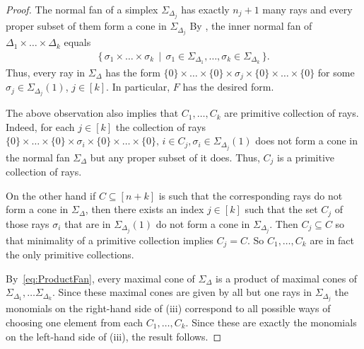 \documentclass[a4paper,11pt]{amsart}
\theoremstyle{definition}
\begin{document}
\begin{proof}
The normal fan of a simplex $\Sigma_{\Delta_j}$ has exactly $n_j + 1$ many rays and every proper subset of them form a cone in $\Sigma_{\Delta_j}$
By \cite[Lemma 7.7]{Ziegler}, the inner normal fan of $\Delta_1 \times \dots \times \Delta_k$  equals
    \begin{align}
    \label{eq:ProductFan}
        \{ \, \sigma_1 \times \dots \times \sigma_k \, \mid \, \sigma_1 \in \Sigma_{\Delta_1}, \dots, \sigma_k \in \Sigma_{\Delta_k} \,  \}.
    \end{align}
Thus, every ray in $\Sigma_\Delta$ has the form $\{0\} \times \dots \times \{0\} \times \sigma_j \times \{0\} \times \dots \times \{0\}$ for some $\sigma_j \in \Sigma_{\Delta_j}(1)$, $j \in [k]$. In particular, $F$ has the desired form.

The above observation also implies that $C_1,\dots,C_k$ are primitive collection of rays. Indeed, for each $j \in [k]$ the collection of rays $\{0\} \times \dots \times \{0\} \times \sigma_i \times \{0\} \times \dots \times \{0\}, \, i \in C_j, \sigma_i \in \Sigma_{\Delta_j}(1)$ does not form a cone in the normal fan $\Sigma_\Delta$ but any proper subset of it does. Thus, $C_j$ is a primitive collection of rays.
  
  On the other hand if $C\subseteq [n+k]$ is such that the corresponding rays do not form a cone in $\Sigma_\Delta$, then there exists an index $j \in [k]$ such that the set $C_j$ of those rays $\sigma_i$ that are in $\Sigma_{\Delta_j}(1)$ do not form a cone in $\Sigma_{\Delta_j}$. Then $C_j \subseteq C$ so that minimality of a primitive collection implies $C_j = C$. So $C_1,\ldots,C_k$ are in fact the only primitive collections.

  By~\eqref{eq:ProductFan}, every maximal cone of $\Sigma_\Delta$ is a product of maximal cones of $\Sigma_{\Delta_1}, \dots \Sigma_{\Delta_k}$. 
  Since these maximal cones are given by all but one rays in $\Sigma_{\Delta_j}$ the monomials on the right-hand side of (iii) correspond to all possible ways of choosing one element from each $C_1,\dots,C_k$. Since these are exactly the monomials on the left-hand side of (iii), the result follows.
\end{proof}
\end{document}
